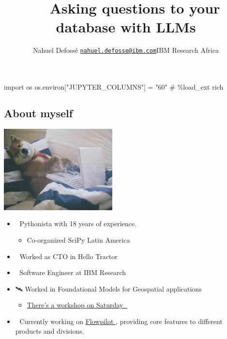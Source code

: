\documentclass[
  letterpaper,
  DIV=11,
  numbers=noendperiod]{scrartcl}
\title{💬 🤖 Asking questions to your database with LLMs}
\author{Nahuel Defossé
\href{mailto:nahuel.defosse@ibm.com}{\nolinkurl{nahuel.defosse@ibm.com}}IBM
Research Africa}
\date{}
\newenvironment{Shaded}{\begin{snugshade}}{\end{snugshade}}
\newcommand{\CommentTok}[1]{\textcolor[rgb]{0.37,0.37,0.37}{#1}}
\newcommand{\ImportTok}[1]{\textcolor[rgb]{0.00,0.46,0.62}{#1}}
\newcommand{\NormalTok}[1]{\textcolor[rgb]{0.00,0.23,0.31}{#1}}
\newcommand{\OperatorTok}[1]{\textcolor[rgb]{0.37,0.37,0.37}{#1}}
\newcommand{\StringTok}[1]{\textcolor[rgb]{0.13,0.47,0.30}{#1}}
\providecommand{\tightlist}{%
  \setlength{\itemsep}{0pt}\setlength{\parskip}{0pt}}
\begin{document}
\maketitle


\begin{Shaded}
\begin{Highlighting}[]
\ImportTok{import}\NormalTok{ os}
\NormalTok{os.environ[}\StringTok{"JUPYTER\_COLUMNS"}\NormalTok{] }\OperatorTok{=} \StringTok{"60"}
\CommentTok{\# \%load\_ext rich}
\end{Highlighting}
\end{Shaded}

\subsection{About myself}\label{about-myself}

\includegraphics[width=\linewidth,height=12em,keepaspectratio]{./img/memes/myself.gif}

\begin{itemize}
\tightlist
\item
  🐍 Pythonista with 18 years of experience.

  \begin{itemize}
  \tightlist
  \item
    Co-organized SciPy Latin America
  \end{itemize}
\item
  🚜 Worked as CTO in Hello Tractor
\item
  🧪 Software Engineer at IBM Research
\item
  🛰️ Worked in Foundational Models for Geospatial applications

  \begin{itemize}
  \tightlist
  \item
    \href{https://pycon-kenya-2025.sessionize.com/session/954933}{There's
    a workshop on Saturday 🤩}
  \end{itemize}
\item
  💬 Currently working on
  \href{https://research.ibm.com/projects/flowpilot}{Flowpilot },
  providing core features to different products and divisions.
\end{itemize}
\end{document}
